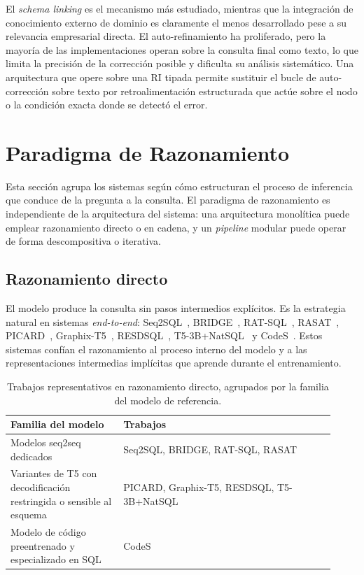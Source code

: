 El \emph{schema linking} es el mecanismo más estudiado, mientras que la
integración de conocimiento externo de dominio es claramente el menos %
desarrollado pese a su relevancia empresarial directa. El
auto-refinamiento ha proliferado, pero la mayoría de las
implementaciones operan sobre la consulta final como texto, lo que
limita la precisión de la corrección posible y dificulta su análisis
sistemático. Una arquitectura que opere sobre una RI tipada permite
sustituir el bucle de auto-corrección sobre texto por
retroalimentación estructurada que actúe sobre el nodo o la condición
exacta donde se detectó el error.

\section{Paradigma de Razonamiento}
\label{sec:sota-d5-razonamiento}

Esta sección agrupa los sistemas según cómo estructuran el proceso de
inferencia que conduce de la pregunta a la consulta. El paradigma de
razonamiento es independiente de la arquitectura del sistema: una
arquitectura monolítica puede emplear razonamiento directo o en cadena,
y un \emph{pipeline} modular puede operar de forma descompositiva o
iterativa.

\subsection{Razonamiento directo}
\label{subsec:sota-d5-directo}

El modelo produce la consulta sin pasos intermedios explícitos. Es la
estrategia natural en sistemas \emph{end-to-end}:
Seq2SQL~\cite{Seq2SQL2017}, BRIDGE~\cite{BRIDGE2020},
RAT-SQL~\cite{RAT-SQL2021}, RASAT~\cite{RASAT2022},
PICARD~\cite{PICARD2022}, Graphix-T5~\cite{Graphix-T52022},
RESDSQL~\cite{RESDSQL2023}, T5-3B+NatSQL~\cite{T5-3B+NatSQL+TokenPreprocessing2023}
y CodeS~\cite{CodeS2024}. Estos sistemas confían el razonamiento al
proceso interno del modelo y a las representaciones intermedias
implícitas que aprende durante el entrenamiento.

\begin{table}[!htbp]
\centering
\footnotesize
\caption{Trabajos representativos en razonamiento directo, agrupados por la familia del modelo de referencia.}
\label{tab:sota-d5-directo}
\begin{tabular}{@{}p{0.32\linewidth}p{0.60\linewidth}@{}}
\toprule
\textbf{Familia del modelo} & \textbf{Trabajos} \\
\midrule
Modelos seq2seq dedicados & Seq2SQL, BRIDGE, RAT-SQL, RASAT \\
Variantes de T5 con decodificación restringida o sensible al esquema & PICARD, Graphix-T5, RESDSQL, T5-3B+NatSQL \\
Modelo de código preentrenado y especializado en SQL & CodeS \\
\bottomrule
\end{tabular}
\end{table}

